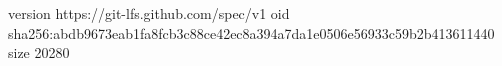 version https://git-lfs.github.com/spec/v1
oid sha256:abdb9673eab1fa8fcb3c88ce42ec8a394a7da1e0506e56933c59b2b413611440
size 20280
